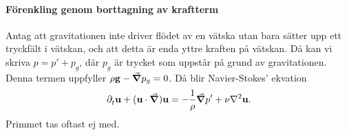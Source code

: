 \paragraph{Förenkling genom borttagning av kraftterm}
Antag att gravitationen inte driver flödet av en vätska utan bara sätter upp ett tryckfält i vätskan, och att detta är enda yttre kraften på vätskan. Då kan vi skriva $p = p' + p_{g}$, där $p_{g}$ är trycket som uppstår på grund av gravitationen. Denna termen uppfyller $\rho\vb{g} - \grad{p_{g}} = 0$. Då blir Navier-Stokes' ekvation
\begin{align*}
	\del{t}{\vb{u}} + (\vb{u}\cdot\grad)\vb{u} = -\frac{1}{\rho}\grad{p'} + \nu\laplacian{\vb{u}}.
\end{align*}
Primmet tas oftast ej med.